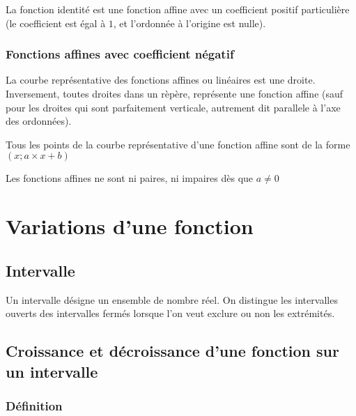 \documentclass[11pt]{article}
\begin{document}
\begin{rem}
 La fonction identité est une fonction affine avec un coefficient positif
 particulière (le coefficient est égal à $1$, et l'ordonnée à l'origine est
 nulle).
\end{rem}
\subsubsection{Fonctions affines avec coefficient négatif}
\label{sec:orgbdc6817}
\begin{center}
\end{center}
\begin{prop}
  La courbe représentative des fonctions affines ou linéaires est une droite.
  Inversement, toutes droites dans un rèpère, représente une fonction affine
  (sauf pour les droites qui sont parfaitement verticale, autrement dit
  parallele à l'axe des ordonnées).

  Tous les points de la courbe représentative d'une fonction affine sont de la forme
  $(x; a \times x + b)$

  Les fonctions affines ne sont ni paires, ni impaires dès que $a \not = 0$
\end{prop}
\section{Variations d'une fonction}
\label{sec:orgee66ed5}
\subsection{Intervalle}
\label{sec:orgaf5e214}
Un intervalle désigne un ensemble de nombre réel. On distingue les intervalles
ouverts des intervalles fermés lorsque l'on veut exclure ou non les extrémités.

\subsection{Croissance et décroissance d'une fonction sur un intervalle}
\label{sec:orgbb05f11}
\subsubsection{Définition}
\label{sec:orgc898649}
\end{document}
